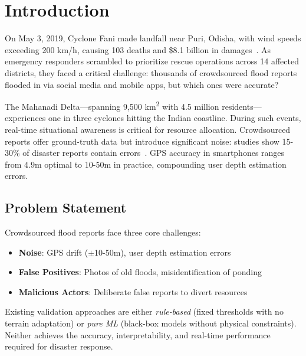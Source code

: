 \documentclass[conference]{IEEEtran}
\begin{document}
\section{Introduction}
\label{sec:introduction}

On May 3, 2019, Cyclone Fani made landfall near Puri, Odisha, with wind speeds exceeding 200 km/h, causing 103 deaths and \$8.1 billion in damages~\cite{imd2019}. As emergency responders scrambled to prioritize rescue operations across 14 affected districts, they faced a critical challenge: thousands of crowdsourced flood reports flooded in via social media and mobile apps, but which ones were accurate?

The Mahanadi Delta---spanning 9,500 km\textsuperscript{2} with 4.5 million residents---experiences one in three cyclones hitting the Indian coastline. During such events, real-time situational awareness is critical for resource allocation. Crowdsourced reports offer ground-truth data but introduce significant noise: studies show 15-30\% of disaster reports contain errors~\cite{meier2015}. GPS accuracy in smartphones ranges from 4.9m optimal to 10-50m in practice, compounding user depth estimation errors.

\subsection{Problem Statement}
Crowdsourced flood reports face three core challenges:
\begin{itemize}
    \item \textbf{Noise}: GPS drift ($\pm$10-50m), user depth estimation errors
    \item \textbf{False Positives}: Photos of old floods, misidentification of ponding
    \item \textbf{Malicious Actors}: Deliberate false reports to divert resources
\end{itemize}

Existing validation approaches are either \textit{rule-based} (fixed thresholds with no terrain adaptation) or \textit{pure ML} (black-box models without physical constraints). Neither achieves the accuracy, interpretability, and real-time performance required for disaster response.
\end{document}
